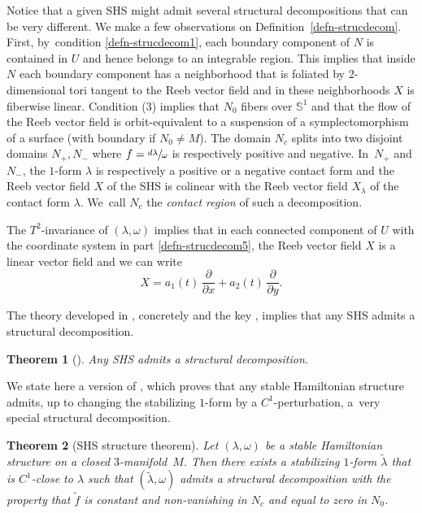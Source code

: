 \documentclass[10pt]{amsart}
\newcommand{\threemanifold}{$3$\nobreakdash-mani\-fold\xspace}
\newtheorem{theorem}{Theorem}[section]
\theoremstyle{definition}
\begin{document}
Notice that a given SHS might admit several structural decompositions that can be very different.
We make a few observations on Definition~\ref{defn-strucdecom}. First, by~condition \eqref{defn-strucdecom1}, each boundary component of $N$ is contained in $U$ and hence belongs to an integrable region. This implies that inside $N$ each boundary component has a neighborhood that is foliated by 2-dimensional tori tangent to the Reeb vector field and in these neighborhoods $X$ is fiberwise linear. Condition (3) implies that $N_0$ fibers over $\mathbb{S}^1$ and that the flow of the Reeb vector field is orbit-equivalent to a suspension of a symplectomorphism of a surface (with boundary if $N_0\neq M$). The domain $N_c$ splits into two disjoint domains $N_+, N_-$ where $f=\sfrac{d\lambda}{\omega}$ is respectively positive and negative. In~$N_+$ and $N_-$, the $1$-form $\lambda$ is respectively a positive or a negative contact form and the Reeb vector field $X$ of the SHS is colinear with the Reeb vector field $X_\lambda$ of the contact form $\lambda$. We~call $N_c$ the \emph{contact region} of such a decomposition.

The $T^2$-invariance of $(\lambda, \omega)$ implies that in each connected component of $U$ with the coordinate system in part \eqref{defn-strucdecom5},
the Reeb vector field $X$ is a linear vector field and we can write
\begin{equation}\label{eq-Xonregular}
X=a_1(t)\,\frac{\partial}{\partial x}+a_2(t)\,\frac{\partial}{\partial y}.
\end{equation}

The theory developed in \cite{CV1}, concretely \cite[Th.\,3.3]{CV1} and the key \cite[Prop.\,3.23]{CV1}, implies that any SHS admits a structural decomposition.
\begin{theorem}[\cite{CV1}]
Any SHS admits a structural decomposition.
\end{theorem}
We state here a version of \cite[Th.\,4.1]{CV1}, which proves that any stable Hamiltonian structure admits, up to changing the stabilizing $1$-form by a $C^1$-perturbation, a~very special structural decomposition.
\begin{theorem}[SHS structure theorem]\label{thm:struc}
Let $(\lambda,\omega)$ be a stable Hamiltonian structure on a closed \threemanifold~$M$. Then there exists a stabilizing $1$-form $\widetilde \lambda$ that is $C^1$-close to $\lambda$ such that $(\widetilde \lambda, \omega)$ admits a structural decomposition with the property that $\widetilde f$ is constant and non-vanishing in $N_c$ and equal to zero in $N_0$.
\end{theorem}
\end{document}
